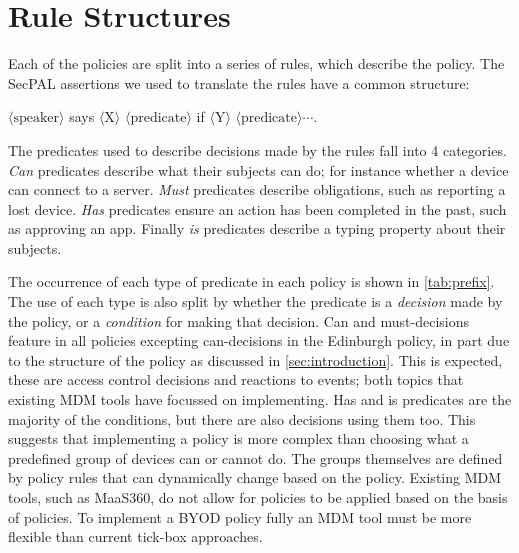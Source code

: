 \documentclass[conference,twocolumn]{IEEEtran}
\begin{document}
\section{Rule Structures}

Each of the policies are split into a series of rules, which describe the policy.
The SecPAL assertions we used to translate the rules have a common structure:

\begin{center}\ttfamily\footnotesize%
  \newcommand{\sptoken}[1]{$\langle\text{#1}\rangle$}
  \sptoken{speaker} says \sptoken{X} \sptoken{predicate} if \sptoken{Y} \sptoken{predicate}$\cdots$.
\end{center}

The predicates used to describe decisions made by the rules fall into 4 categories.
\emph{Can} predicates describe what their subjects can do; for instance whether a device can connect to a server.
\emph{Must} predicates describe obligations, such as reporting a lost device.
\emph{Has} predicates ensure an action has been completed in the past, such as approving an app.
Finally \emph{is} predicates describe a typing property about their subjects.

The occurrence of each type of predicate in each policy is shown in \autoref{tab:prefix}.
The use of each type is also split by whether the predicate is a \emph{decision} made by the policy, or a \emph{condition} for making that decision.
Can and must-decisions feature in all policies excepting can-decisions in the Edinburgh policy, in part due to the structure of the policy as discussed in \autoref{sec:introduction}.
This is expected, these are access control decisions and reactions to events; both topics that existing MDM tools have focussed on implementing.
Has and is predicates are the majority of the conditions, but there are also decisions using them too.
This suggests that implementing a policy is more complex than choosing what a predefined group of devices can or cannot do.
The groups themselves are defined by policy rules that can dynamically change based on the policy.
Existing MDM tools, such as MaaS360, do not allow for policies to be applied based on the basis of policies.
To implement a BYOD policy fully an MDM tool must be more flexible than current tick-box approaches.
\end{document}
